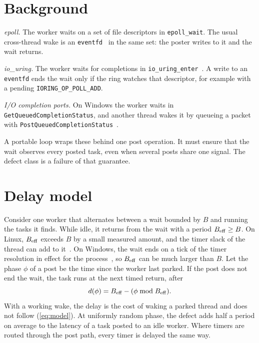 \section{Background}\label{sec:background}

\emph{epoll.} The worker waits on a set of file descriptors in \texttt{epoll\_wait}. The usual
cross-thread wake is an \texttt{eventfd}~\cite{manpages2026eventfd} in the same set: the poster
writes to it and the wait returns.

\emph{io\_uring.} The worker waits for completions in
\texttt{io\_\allowbreak{}uring\_\allowbreak{}enter}~\cite{liburing2026iouringenter}.
A write to an \texttt{eventfd} ends the wait only if the ring watches that descriptor, for
example with a pending
\texttt{IORING\_\allowbreak{}OP\_\allowbreak{}POLL\_\allowbreak{}ADD}.

\emph{I/O completion ports.} On Windows the worker waits in
\texttt{GetQueued\allowbreak{}Completion\allowbreak{}Status}, and another thread wakes it by
queueing a packet with
\texttt{PostQueued\allowbreak{}Completion\allowbreak{}Status}~\cite{microsoft2026iocp}.

A portable loop wraps these behind one post operation. It must ensure that the wait observes
every posted task, even when several posts share one signal. The defect class is a failure of
that guarantee.

\section{Delay model}\label{sec:model}

Consider one worker that alternates between a wait bounded by $B$ and running the tasks it
finds. While idle, it returns from the wait with a period $B_{\mathrm{eff}} \ge B$. On Linux, $B_{\mathrm{eff}}$
exceeds $B$ by a small measured amount, and the timer slack of the thread can add to
it~\cite{manpages2026timerslack}. On Windows, the wait ends on a tick of the timer resolution in
effect for the process~\cite{microsoft2026timebeginperiod}, so $B_{\mathrm{eff}}$ can be much larger than
$B$. Let the phase $\phi$ of a post be the time since the worker last parked. If the post does
not end the wait, the task runs at the next timed return, after
\begin{equation}
  d(\phi) = B_{\mathrm{eff}} - (\phi \bmod B_{\mathrm{eff}}).
  \label{eq:model}
\end{equation}
With a working wake, the delay is the cost of waking a parked thread and does not follow
(\ref{eq:model}). At uniformly random phase, the defect adds half a period on average to the
latency of a task posted to an idle worker. Where timers are routed through the post path,
every timer is delayed the same way.

